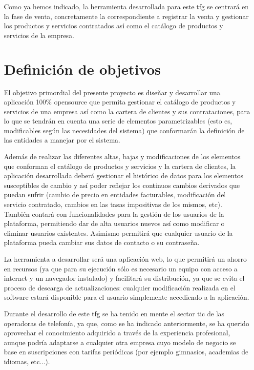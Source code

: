 Como ya hemos indicado, la herramienta desarrollada para este \acrshort{tfg} se centrará en la fase de venta, concretamente la correspondiente a registrar la venta y gestionar los productos y servicios contratados así como el catálogo de productos y servicios de la empresa.


\section{Definición de objetivos}
\label{sec:objetivos}


El objetivo primordial del presente proyecto es diseñar y desarrollar una aplicación 100\% \gls{opensource} que permita gestionar el catálogo de productos y servicios de una empresa así como la cartera de clientes y sus contrataciones, para lo que se tendrán en cuenta una serie de elementos parametrizables (esto es, modificables según las necesidades del sistema) que conformarán la definición de las entidades a manejar por el sistema.

Además de realizar las diferentes altas, bajas y modificaciones de los elementos que conforman el catálogo de productos y servicios y la cartera de clientes, la aplicación desarrollada deberá gestionar el histórico de datos para los elementos susceptibles de cambio y así poder reflejar los continuos cambios derivados que puedan sufrir (cambio de precio en entidades facturables, modificación del servicio contratado, cambios en las tasas impositivas de los mismos, etc). También contará con funcionalidades para la gestión de los usuarios de la plataforma, permitiendo dar de alta usuarios nuevos así como modificar o eliminar usuarios existentes. Asimismo permitirá que cualquier usuario de la plataforma pueda cambiar sus datos de contacto o su contraseña.

La herramienta a desarrollar será una aplicación web, lo que permitirá un ahorro en recursos (ya que para su ejecución sólo es necesario un equipo con acceso a internet y un navegador instalado) y facilitará su distribución, ya que se evita el proceso de descarga de actualizaciones: cualquier modificación realizada en el software estará disponible para el usuario simplemente accediendo a la aplicación.

Durante el desarrollo de este \acrshort{tfg} se ha tenido en mente el sector \acrshort{tic} de las operadoras de telefonía, ya que, como se ha indicado anteriormente, se ha querido aprovechar el conocimiento adquirido a través de la experiencia profesional, aunque podría adaptarse a cualquier otra empresa cuyo modelo de negocio se base en suscripciones con tarifas periódicas (por ejemplo gimnasios, academias de idiomas, etc...).


